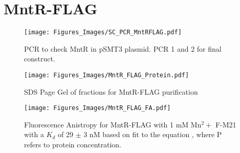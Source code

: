 \documentclass[12pt,twoside]{reedthesis}
\begin{document}
 \clearpage
      	
      	
      	
  
  \section{MntR-FLAG}
        	\begin{figure}[h!tbp]
        		\centering
        		\texttt{[image: Figures\_Images/SC\_PCR\_MntRFLAG.pdf]}
        		\caption[PCR to Create MntR-FLAG]{PCR to check MntR in pSMT3 plasmid. PCR 1 and 2 for final construct.}
        		\label{PCRMntRFLAG}
        	\end{figure}
     
        	\begin{figure}[h!tbp]
        		\centering
        		\texttt{[image: Figures\_Images/MntR\_FLAG\_Protein.pdf]}
        		\caption[MntR-FLAG Purification]{SDS Page Gel of fractions for MntR-FLAG purification}
        		\label{PurificationMntRFLAG}
        	\end{figure}
     
       	\begin{figure}[h!tbp]
       		\centering
       		\texttt{[image: Figures\_Images/MntR\_FLAG\_FA.pdf]}
       		\caption[Determining DNA Activity of MntR-FLAG by Fluorescence Anistropy]{Fluorescence Anistropy for MntR-FLAG with 1 mM Mn$^2+$ F-M21 with a $K_{d}$ of 29 $\pm$ 3 nM based on fit to the equation \FAstdfit , where P refers to protein concentration.}
       		\label{MntRFLAGFA}
       	\end{figure}
      
\end{document}
